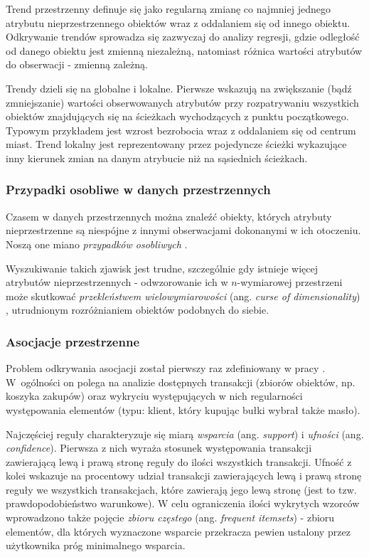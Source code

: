 \documentclass[12pt]{article}
\begin{document}
Trend przestrzenny definuje się \cite{toptrendy} jako regularną zmianę co najmniej jednego atrybutu nieprzestrzennego obiektów wraz z oddalaniem się od innego obiektu. Odkrywanie trendów sprowadza się zazwyczaj do analizy regresji, gdzie odległość od danego obiektu jest zmienną niezależną, natomiast różnica wartości atrybutów do obserwacji - zmienną zależną.

Trendy dzieli się na globalne i lokalne. Pierwsze wskazują na zwiększanie (bądź zmniejszanie) wartości obserwowanych atrybutów przy rozpatrywaniu wszystkich obiektów znajdujących się na ścieżkach wychodzących z punktu początkowego. Typowym przykładem jest wzrost bezrobocia wraz z oddalaniem się od centrum miast. Trend lokalny jest reprezentowany przez pojedyncze ścieżki wykazujące inny kierunek zmian na danym atrybucie niż na sąsiednich ścieżkach.

\subsubsection{Przypadki osobliwe w danych przestrzennych}

Czasem w danych przestrzennych można znaleźć obiekty, których atrybuty nieprzestrzenne są niespójne z innymi obserwacjami dokonanymi w ich otoczeniu. Noszą one miano \textit{przypadków osobliwych} \cite{przypadeg}. 

Wyszukiwanie takich zjawisk jest trudne, szczególnie gdy istnieje więcej atrybutów nieprzestrzennych - odwzorowanie ich w $n$-wymiarowej przestrzeni może skutkować \textit{przekleństwem wielowymiarowości} (ang. \textit{curse of dimensionality}) \cite{kurwa}, utrudnionym rozróżnianiem obiektów podobnych do siebie.

\subsubsection{Asocjacje przestrzenne}

Problem odkrywania asocjacji został pierwszy raz zdefiniowany w pracy \cite{asoc}. W~ogólności on polega na analizie dostępnych transakcji (zbiorów obiektów, np. koszyka zakupów) oraz wykryciu występujących w nich regularności występowania elementów (typu: klient, który kupując bułki wybrał także masło).

Najczęściej reguły charakteryzuje się miarą \textit{wsparcia} (ang. \textit{support}) i \textit{ufności} (ang. \textit{confidence}). Pierwsza z nich wyraża stosunek występowania transakcji zawierającą lewą i prawą stronę reguły do ilości wszystkich transakcji. Ufność z kolei wskazuje na procentowy udział transakcji zawierających lewą i prawą stronę reguły we wszystkich transakcjach, które zawierają jego lewą stronę (jest to tzw. prawdopodobieństwo warunkowe). W celu ograniczenia ilości wykrytych wzorców wprowadzono także pojęcie \textit{zbioru częstego} (ang. \textit{frequent itemsets}) - zbioru elementów, dla których wyznaczone wsparcie przekracza pewien ustalony przez użytkownika próg minimalnego wsparcia. 
\end{document}
